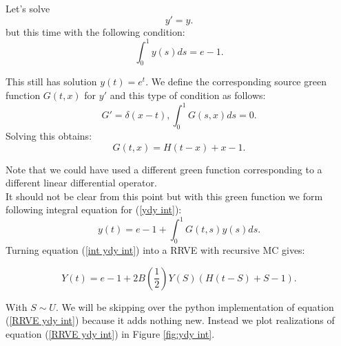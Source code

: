 \documentclass[a4paper,12pt]{article}
\begin{document}
\begin{example}[$y'=y$ average condition]
    Let's solve
    \begin{equation} \label{ydy int}
        y'=y.
    \end{equation}
    but this time with the following condition:
    \begin{equation}
        \int_{0}^{1} y(s) ds = e-1.
    \end{equation}

    This still has solution $y(t)=e^{t}$. We define the corresponding source
    green function $G(t,x)$ for $y'$ and this type of condition as follows:
    \begin{equation}
        G'= \delta(x-t), \int_{0}^{1}G(s,x)ds = 0.
    \end{equation}
    Solving this obtains:
    \begin{equation}
        G(t,x) = H(t-x) +x-1.
    \end{equation}

    Note that we could have used a different green function corresponding
    to a different linear differential operator. \\

    It should not be clear from this point but with this green
    function we form following integral equation for (\ref{ydy int}):
    \begin{equation} \label{int ydy int}
        y(t)= e -1 + \int_{0}^{1}G(t,s)y(s)ds.
    \end{equation}
    Turning equation (\ref{int ydy int}) into a RRVE with recursive MC gives:

    \begin{equation}\label{RRVE ydy int}
        Y(t)= e-1 + 2B\left(\frac{1}{2} \right)Y(S)(H(t-S)+S-1) .
    \end{equation}

    With $S \sim U$. We will be skipping over the python implementation of equation (\ref{RRVE ydy int})
    because it adds nothing new.
    Instead we plot realizations of equation (\ref{RRVE ydy int}) in Figure \ref{fig:ydy int}.


\end{example}
\end{document}
